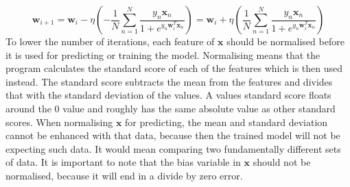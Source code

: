 \[ \mathbf{w}_{i+1} = \mathbf{w}_i - \eta \left( -\frac{1}{N} \sum_{n=1}^N \frac{y_n \mathbf{x}_n}{1 + e^{y_n \mathbf{w}_i^T \mathbf{x}_n}} \right) = \mathbf{w}_i + \eta \left( \frac{1}{N} \sum_{n=1}^N \frac{y_n \mathbf{x}_n}{1 + e^{y_n \mathbf{w}_i^T \mathbf{x}_n}} \right) \]
To lower the number of iterations, each feature of $\mathbf{x}$ should be normalised before it is used for predicting or training the model. Normalising means that the program calculates the standard score of each of the features which is then used instead. The standard score subtracts the mean from the features and divides that with the standard deviation of the values. A values standard score floats around the 0 value and roughly has the same absolute value as other standard scores. When normalising $\mathbf{x}$ for predicting, the mean and standard deviation cannot be enhanced with that data, because then the trained model will not be expecting such data. It would mean comparing two fundamentally different sets of data. It is important to note that the bias variable in $\mathbf{x}$ should not be normalised, because it will end in a divide by zero error.
